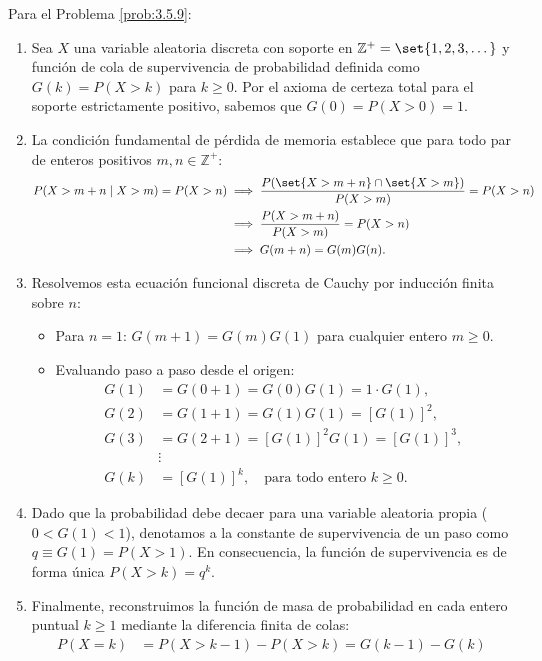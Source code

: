 \begin{solucion}
	\label{sol:3.5.9}
	Para el Problema \ref{prob:3.5.9}:
	\begin{enumerate}
		\item Sea $X$ una variable aleatoria discreta con soporte en $\mathbb{Z}^+ = \set{1, 2, 3, \dots}$ y función de cola de supervivencia de probabilidad definida como $G(k) = P(X > k)$ para $k \ge 0$. Por el axioma de certeza total para el soporte estrictamente positivo, sabemos que $G(0) = P(X > 0) = 1$.
		\item La condición fundamental de pérdida de memoria establece que para todo par de enteros positivos $m, n \in \mathbb{Z}^+$:
		\begin{align*}
			P(X > m+n \mid X > m) = P(X > n) &\implies \dfrac{P(\set{X > m+n} \cap \set{X > m})}{P(X > m)} = P(X > n) \\
			&\implies \dfrac{P(X > m+n)}{P(X > m)} = P(X > n) \\
			&\implies G(m+n) = G(m) G(n).
		\end{align*}
		\item Resolvemos esta ecuación funcional discreta de Cauchy por inducción finita sobre $n$:
		\begin{itemize}
			\item Para $n = 1$: $G(m+1) = G(m) G(1)$ para cualquier entero $m \ge 0$.
			\item Evaluando paso a paso desde el origen:
			\begin{align*}
				G(1) &= G(0+1) = G(0) G(1) = 1 \cdot G(1), \\
				G(2) &= G(1+1) = G(1) G(1) = [G(1)]^2, \\
				G(3) &= G(2+1) = [G(1)]^2 G(1) = [G(1)]^3, \\
				&\vdots \\
				G(k) &= [G(1)]^k, \quad \text{para todo entero } k \ge 0.
			\end{align*}
		\end{itemize}
		\item Dado que la probabilidad debe decaer para una variable aleatoria propia ($0 < G(1) < 1$), denotamos a la constante de supervivencia de un paso como $q \equiv G(1) = P(X > 1)$. En consecuencia, la función de supervivencia es de forma única $P(X > k) = q^k$.
		\item Finalmente, reconstruimos la función de masa de probabilidad en cada entero puntual $k \ge 1$ mediante la diferencia finita de colas:
		\begin{align*}
			P(X = k) &= P(X > k-1) - P(X > k) = G(k-1) - G(k) \\

\end{align*}
\end{enumerate}
\end{solucion}
